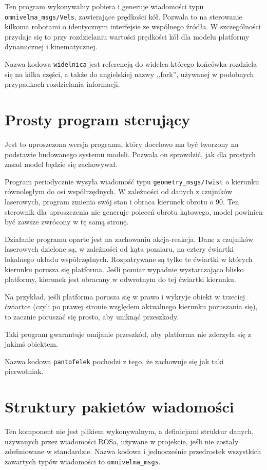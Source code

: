 	Ten program wykonywalny pobiera i generuje wiadomości typu \texttt{omnivelma\_msgs/Vels}, zawierające prędkości kół.
	Pozwala to na sterowanie kilkoma robotami o identycznym interfejsie ze wspólnego źródła.
	W szczególności przydaje się to przy rozdzielaniu wartości prędkości kół dla modelu platformy dynamicznej i kinematycznej.
	
	Nazwa kodowa \texttt{widelnica} jest referencją do widelca którego końcówka rozdziela się na kilka części, a także do angielskiej nazwy ,,fork'', używanej w podobnych 
	przypadkach rozdzielania informacji.
	
\section{Prosty program sterujący}
	Jest to uproszczona wersja programu, który docelowo ma być tworzony na podstawie budowanego systemu modeli.
	Pozwala on sprawdzić, jak dla prostych zasad model będzie się zachowywał.
	
	Program periodycznie wysyła wiadomość typu \texttt{geometry\_msgs/Twist} o kierunku równoległym do osi współrzędnych.
	W zależności od danych z czujników laserowych, program zmienia swój stan i obraca kierunek obrotu o 90\textdegree.
	Ten sterownik dla uproszczenia nie generuje poleceń obrotu kątowego, model powinien być zawsze zwrócony w tę samą stronę.
	
	Działanie programu oparte jest na zachowaniu akcja-reakcja.
	Dane z czujników laserowych dzielone są, w zależności od kąta pomiaru, na cztery ćwiartki lokalnego układu współrzędnych.
	Rozpatrywane są tylko te ćwiartki w których kierunku porusza się platforma.
	Jeśli pomiar wypadnie wystarczająco blisko platformy, kierunek jest obracany w odwrotnym do tej ćwiartki kierunku.
	
	Na przykład, jeśli platforma porusza się w prawo i wykryje obiekt w trzeciej ćwiartce (czyli po prawej stronie względem aktualnego kierunku poruszania się),
	to zacznie poruszać się prosto, aby uniknąć przeszkody.
	
	Taki program gwarantuje omijanie przeszkód, aby platforma nie zderzyła się z jakimś obiektem.
	
	Nazwa kodowa \texttt{pantofelek} pochodzi z tego, że zachowuje się jak taki pierwotniak.
	
\section{Struktury pakietów wiadomości}
	Ten komponent nie jest plikiem wykonywalnym, a definicjami struktur danych, używanych przez wiadomości ROSa, używane w projekcie, jeśli nie zostały zdefiniowane w standardzie.
	Nazwa kodowa i jednocześnie przedrostek wszystkich zawartych typów wiadomości to \texttt{omnivelma\_msgs}.

